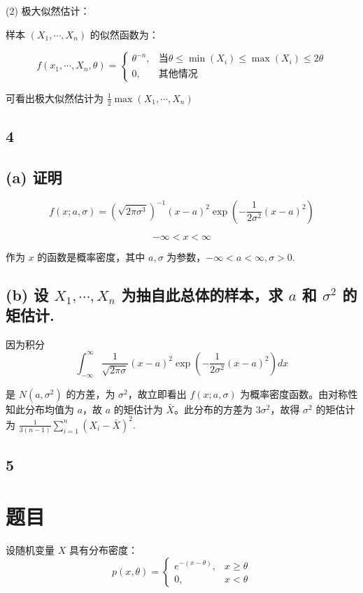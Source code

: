 \documentclass[UTF8]{report}
\theoremstyle{MyLineTheoremStyle} %
\theoremstyle{MyBlockTheoremStyle} %
\theoremstyle{MySubsubsectionStyle} %
\begin{document}
(2) 极大似然估计：

样本 $(X_1,\cdots,X_n)$ 的似然函数为：

\[
f(x_1,\cdots,X_n,\theta) = \begin{cases}
\theta^{-n}, & \text{当} \theta \leq \min(X_i) \leq \max(X_i) \leq 2\theta \\
0, & \text{其他情况}
\end{cases}
\]

可看出极大似然估计为 $\frac{1}{2}\max(X_1,\cdots,X_n)$


\subsection{4} 
\subsection*{(a) 证明}

$$f(x;a,\sigma) = (\sqrt{2\pi\sigma^3})^{-1}(x-a)^2\exp\left(-\frac{1}{2\sigma^2}(x-a)^2\right)$$

$$-\infty < x < \infty$$

作为 $x$ 的函数是概率密度，其中 $a,\sigma$ 为参数，$-\infty < a < \infty, \sigma > 0$.

\subsection*{(b) 设 $X_1,\cdots,X_n$ 为抽自此总体的样本，求 $a$ 和 $\sigma^2$ 的矩估计.}

因为积分
$$\int_{-\infty}^{\infty}\frac{1}{\sqrt{2\pi\sigma}}(x-a)^2\exp\left(-\frac{1}{2\sigma^2}(x-a)^2\right)dx$$

是 $N(a,\sigma^2)$ 的方差，为 $\sigma^2$，故立即看出 $f(x;a,\sigma)$ 为概率密度函数。由对称性知此分布均值为 $a$，故 $a$ 的矩估计为 $\bar{X}$。此分布的方差为 $3\sigma^2$，故得 $\sigma^2$ 的矩估计为 $\frac{1}{3(n-1)}\sum_{i=1}^n(X_i-\bar{X})^2$.


\subsection{5}
\section*{题目}
设随机变量 $X$ 具有分布密度：
$$
p(x,\theta)=\begin{cases}
e^{-(x-\theta)}, & x \geq \theta \\
0, & x < \theta
\end{cases}
$$
\end{document}
